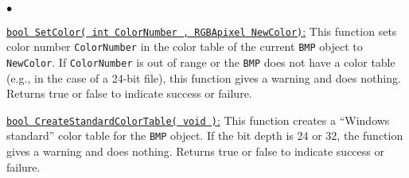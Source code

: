 \documentclass[12pt]{article}
\begin{document}
\begin{list}{$\bullet\hspace{.125in}$}{}
\item 
\underline{\texttt{bool SetColor( int ColorNumber , RGBApixel NewColor)}:} 
This function 
sets color number \texttt{ColorNumber} in the color table of the 
current \texttt{BMP} object to \texttt{NewColor}.  
If \texttt{ColorNumber} is out of range or the \texttt{BMP} 
does not have a color table (e.g., in the case 
of a 24-bit file), this function gives a warning and does nothing.
Returns true or false to indicate success or failure.

\item 
\underline{\texttt{bool CreateStandardColorTable( void )}:} 
This function creates a ``Windows standard'' color table for the 
\texttt{BMP} object. If the bit depth is 24 or 32, the function gives a 
warning and does nothing. Returns true or false to indicate success or failure.


\end{list}
\end{document}
